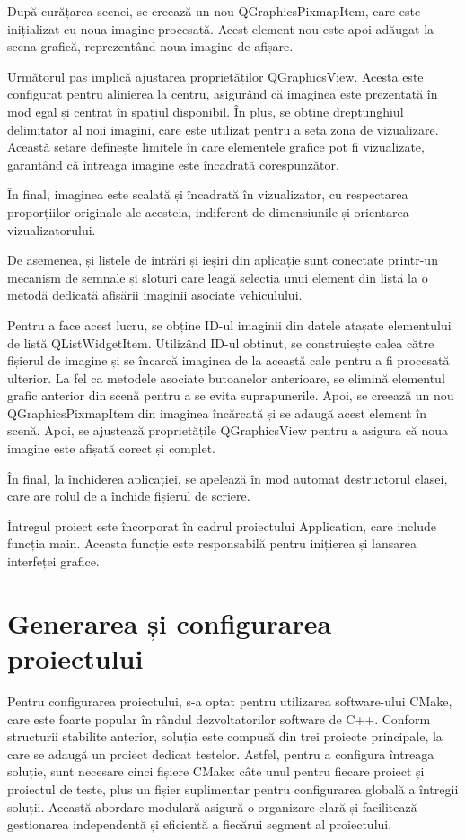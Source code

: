 \documentclass[a4paper,12pt]{report}
\begin{document}
După curățarea scenei, se creează un nou QGraphicsPixmapItem, care este inițializat cu noua imagine procesată. Acest element nou este apoi adăugat la scena grafică, reprezentând noua imagine de afișare.

Următorul pas implică ajustarea proprietăților QGraphicsView. Acesta este configurat pentru alinierea la centru, asigurând că imaginea este prezentată în mod egal și centrat în spațiul disponibil. În plus, se obține dreptunghiul delimitator al noii imagini, care este utilizat pentru a seta zona de vizualizare. Această setare definește limitele în care elementele grafice pot fi vizualizate, garantând că întreaga imagine este încadrată corespunzător.

În final, imaginea este scalată și încadrată în vizualizator, cu respectarea proporțiilor originale ale acesteia, indiferent de dimensiunile și orientarea vizualizatorului.

De asemenea, și listele de intrări și ieșiri din aplicație sunt conectate printr-un mecanism de semnale și sloturi care leagă selecția unui element din listă la o metodă dedicată afișării imaginii asociate vehiculului.

Pentru a face acest lucru, se obține ID-ul imaginii din datele atașate elementului de listă QListWidgetItem. Utilizând ID-ul obținut, se construiește calea către fișierul de imagine și se încarcă imaginea de la această cale pentru a fi procesată ulterior. La fel ca metodele asociate butoanelor anterioare, se elimină elementul grafic anterior din scenă pentru a se evita suprapunerile. Apoi, se creează un nou QGraphicsPixmapItem din imaginea încărcată și se adaugă acest element în scenă. Apoi, se ajustează proprietățile QGraphicsView pentru a asigura că noua imagine este afișată corect și complet.

În final, la închiderea aplicației, se apelează în mod automat destructorul clasei, care are rolul de a închide fișierul de scriere.

Întregul proiect este încorporat în cadrul proiectului Application, care include funcția main. Aceasta funcție este responsabilă pentru inițierea și lansarea interfeței grafice.

\section{Generarea și configurarea proiectului}
Pentru configurarea proiectului, s-a optat pentru utilizarea software-ului CMake, care este foarte popular în rândul dezvoltatorilor software de C++. Conform structurii stabilite anterior, soluția este compusă din trei proiecte principale, la care se adaugă un proiect dedicat testelor. Astfel, pentru a configura întreaga soluție, sunt necesare cinci fișiere CMake: câte unul pentru fiecare proiect și proiectul de teste, plus un fișier suplimentar pentru configurarea globală a întregii soluții. Această abordare modulară asigură o organizare clară și facilitează gestionarea independentă și eficientă a fiecărui segment al proiectului.
\end{document}
